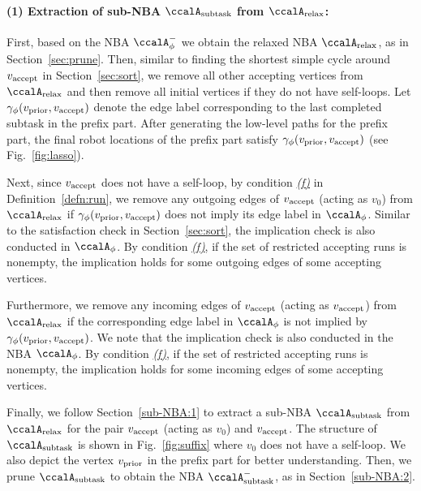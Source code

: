 \documentclass[Afour,sageh,times]{sagej}
\newcommand{\auto}[1]{\ccalA_{\textup{#1}}}
\newcommand{\autop}{\ccalA_{\phi}}
\newcommand{\vertex}[1]{v_{\textup{#1}}}
\begin{document}
{{  \paragraph{(1) Extraction of sub-NBA $\auto{subtask}$ from $\auto{relax}$:}\label{sec:suf_extract} First, based on the NBA $\autop^-$ we obtain the relaxed NBA $\auto{relax}$, as in Section~\ref{sec:prune}.  Then, similar to finding the shortest simple cycle around $\vertex{accept}$ in Section~\ref{sec:sort}, we remove all other accepting vertices from $\auto{relax}$ and then remove all initial vertices if they do not have self-loops. Let $\gamma_{\phi}(\vertex{prior}, \vertex{accept})$ denote the edge label corresponding to the last completed subtask in the prefix part. After generating the low-level paths for the prefix part, the final robot locations of the prefix part satisfy $\gamma_{\phi}(\vertex{prior}, \vertex{accept})$ (see Fig.~\ref{fig:lasso}).

  Next, since $\vertex{accept}$ does not have a self-loop,  by condition \hyperref[cond:f]{\it (f)} in Definition~\ref{defn:run}, we remove any outgoing edges of $\vertex{accept}$ (acting as $v_0$) from $\auto{relax}$ if $\gamma_{\phi}(\vertex{prior}, \vertex{accept})$ does not imply its edge label in $\autop$. Similar to the satisfaction check in Section~\ref{sec:sort}, the implication check is also  conducted in $\autop$. By condition \hyperref[cond:f]{\it (f)}, if the set of restricted accepting runs is nonempty, the  implication holds  for some  outgoing edges of some accepting vertices.

  Furthermore, we remove any incoming edges of $\vertex{accept}$ (acting as $\vertex{accept}$) from $\auto{relax}$ if the corresponding edge label in $\autop$ is not implied by $\gamma_\phi(\vertex{prior}, \vertex{accept})$.  We note that the implication check is also conducted in the NBA $\autop$. By condition \hyperref[cond:f]{\it (f)}, if the set of restricted accepting runs is nonempty, the implication holds for some incoming edges of some accepting vertices.

  Finally, we  follow Section~\ref{sub-NBA:1} to  extract a sub-NBA $\auto{subtask}$ from $\auto{relax}$ for the pair $\vertex{accept}$ (acting as $v_0$) and $\vertex{accept}$. The structure of $\auto{subtask}$ is shown in Fig.~\ref{fig:suffix} where $v_0$ does not have a self-loop. We also depict the vertex $\vertex{prior}$ in the prefix part for better understanding.  Then, we prune $\auto{subtask}$ to obtain the NBA $\auto{subtask}^-$, as in Section~\ref{sub-NBA:2}.


}}
\end{document}
